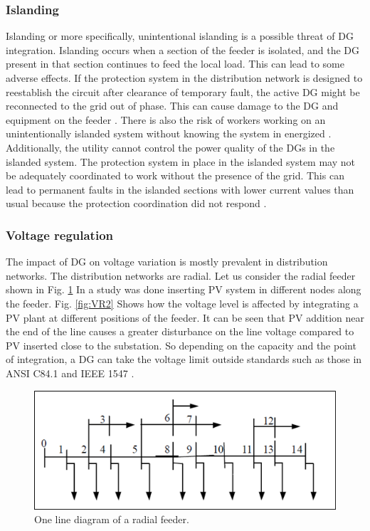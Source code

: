 \subsubsection{Islanding}
Islanding or more specifically, unintentional islanding is a possible threat of DG integration. Islanding occurs when a section of the feeder is isolated, and the DG present in that section continues to feed the local load. This can lead to some adverse effects. If the protection system in the distribution network is designed to reestablish the circuit after clearance of temporary fault, the active DG might be reconnected to the grid out of phase. This can cause damage to the DG and equipment on the feeder \cite{ILAND_1}. There is also the risk of workers working on an unintentionally islanded system without knowing the system in energized \cite{ILAND_1}. Additionally, the utility cannot control the power quality of the DGs in the islanded system. The protection system in place in the islanded system may not be adequately coordinated to work without the presence of the grid. This can lead to permanent faults in the islanded sections with lower current values than usual because the protection coordination did not respond \cite{ILAND_2}.

\subsubsection{Voltage regulation}
The impact of DG on voltage variation is mostly prevalent in distribution networks. The distribution networks are radial. Let us consider the radial feeder shown in 
Fig. \ref{fig:VR1} In \cite{VR1} a study was done inserting PV system in different nodes along the feeder. Fig. \ref{fig:VR2} Shows how the voltage level is affected by integrating a PV plant at different positions of the feeder. It can be seen that PV addition near the end of the line causes a greater disturbance on the line voltage compared to PV inserted close to the substation. So depending on the capacity and the point of integration, a DG can take the voltage limit outside standards such as those in ANSI C84.1 and IEEE 1547 \cite{VR2}. 

\begin{figure}[!h]
\centering
\includegraphics[width=0.85\linewidth]{figs/VR1.png}
\caption[One line diagram of a radial feeder]{One line diagram of a radial feeder.\cite{VR1}}
\label{fig:VR1}
\end{figure}

